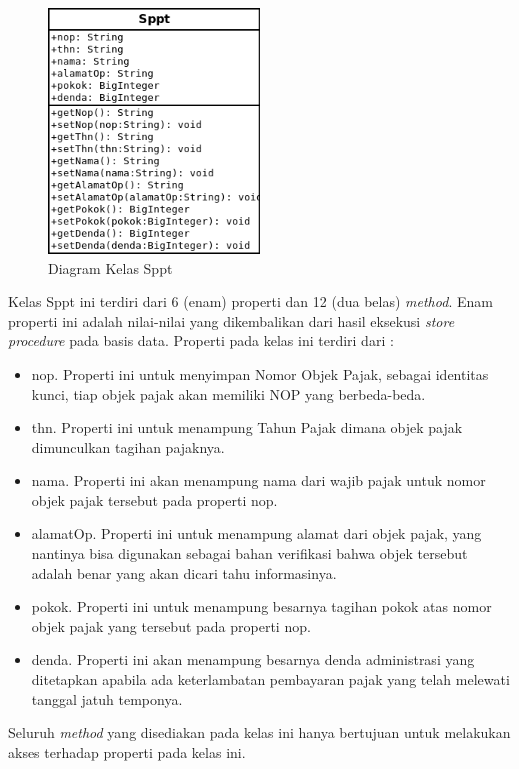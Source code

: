 \begin{figure}[H]
  \centering
  \includegraphics[width=0.5\textwidth]{./resources/uml/uml-class-Sppt}
  \caption{Diagram Kelas Sppt}
  \label{fig:uml-class-Sppt}
\end{figure}

Kelas Sppt ini terdiri dari 6 (enam) properti dan 12 (dua belas) \textit{method}. Enam properti ini adalah nilai-nilai yang dikembalikan dari hasil eksekusi \textit{store procedure} pada basis data. Properti pada kelas ini terdiri dari :

\begin{itemize}
\item nop. Properti ini untuk menyimpan Nomor Objek Pajak, sebagai identitas kunci, tiap objek pajak akan memiliki NOP yang berbeda-beda.
\item thn. Properti ini untuk menampung Tahun Pajak dimana objek pajak dimunculkan tagihan pajaknya.
\item nama. Properti ini akan menampung nama dari wajib pajak untuk nomor objek pajak tersebut pada properti nop.
\item alamatOp. Properti ini untuk menampung alamat dari objek pajak, yang nantinya bisa digunakan sebagai bahan verifikasi bahwa objek tersebut adalah benar yang akan dicari tahu informasinya.
\item pokok. Properti ini untuk menampung besarnya tagihan pokok atas nomor objek pajak yang tersebut pada properti nop.
\item denda. Properti ini akan menampung besarnya denda administrasi yang ditetapkan apabila ada keterlambatan pembayaran pajak yang telah melewati tanggal jatuh temponya.
\end{itemize}

Seluruh \textit{method} yang disediakan pada kelas ini hanya bertujuan untuk melakukan akses terhadap properti pada kelas ini.


